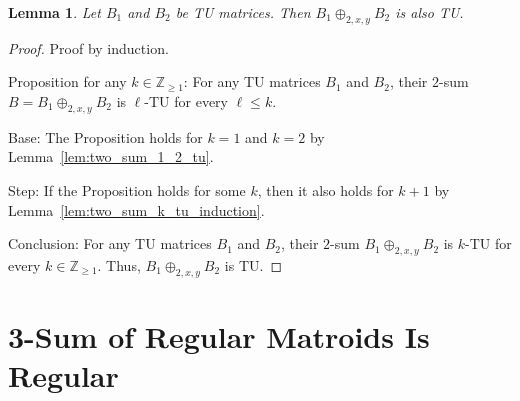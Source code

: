 \documentclass{article}
\newtheorem{lemma}{Lemma}
\theoremstyle{definition}
\begin{document}
\begin{lemma}\label{lem:two_sum_tu}
    Let $B_{1}$ and $B_{2}$ be TU matrices. Then $B_{1} \oplus_{2, x, y} B_{2}$ is also TU.
\end{lemma}

\begin{proof}
    Proof by induction.

    Proposition for any $k \in \mathbb{Z}_{\geq 1}$: For any TU matrices $B_{1}$ and $B_{2}$, their $2$-sum $B = B_{1} \oplus_{2, x, y} B_{2}$ is $\ell$-TU for every $\ell \leq k$.

    Base: The Proposition holds for $k = 1$ and $k = 2$ by Lemma~\ref{lem:two_sum_1_2_tu}.

    Step: If the Proposition holds for some $k$, then it also holds for $k + 1$ by Lemma~\ref{lem:two_sum_k_tu_induction}.

    Conclusion: For any TU matrices $B_{1}$ and $B_{2}$, their $2$-sum $B_{1} \oplus_{2, x, y} B_{2}$ is $k$-TU for every $k \in \mathbb{Z}_{\geq 1}$. Thus, $B_{1} \oplus_{2, x, y} B_{2}$ is TU.
\end{proof}

\newpage
\section{3-Sum of Regular Matroids Is Regular}
\end{document}

